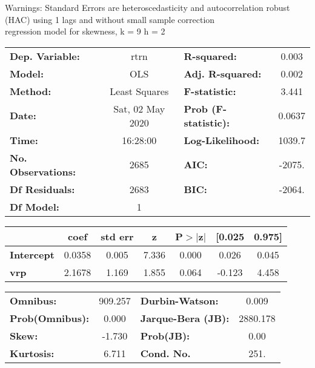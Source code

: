 Warnings: \newline
 [1] Standard Errors are heteroscedasticity and autocorrelation robust (HAC) using 1 lags and without small sample correction\\ 

regression model for skewness, k = 9 h = 2\begin{center}
\begin{tabular}{lclc}
\toprule
\textbf{Dep. Variable:}    &       rtrn       & \textbf{  R-squared:         } &     0.003   \\
\textbf{Model:}            &       OLS        & \textbf{  Adj. R-squared:    } &     0.002   \\
\textbf{Method:}           &  Least Squares   & \textbf{  F-statistic:       } &     3.441   \\
\textbf{Date:}             & Sat, 02 May 2020 & \textbf{  Prob (F-statistic):} &   0.0637    \\
\textbf{Time:}             &     16:28:00     & \textbf{  Log-Likelihood:    } &    1039.7   \\
\textbf{No. Observations:} &        2685      & \textbf{  AIC:               } &    -2075.   \\
\textbf{Df Residuals:}     &        2683      & \textbf{  BIC:               } &    -2064.   \\
\textbf{Df Model:}         &           1      & \textbf{                     } &             \\
\bottomrule
\end{tabular}
\begin{tabular}{lcccccc}
                   & \textbf{coef} & \textbf{std err} & \textbf{z} & \textbf{P$> |$z$|$} & \textbf{[0.025} & \textbf{0.975]}  \\
\midrule
\textbf{Intercept} &       0.0358  &        0.005     &     7.336  &         0.000        &        0.026    &        0.045     \\
\textbf{vrp}       &       2.1678  &        1.169     &     1.855  &         0.064        &       -0.123    &        4.458     \\
\bottomrule
\end{tabular}
\begin{tabular}{lclc}
\textbf{Omnibus:}       & 909.257 & \textbf{  Durbin-Watson:     } &    0.009  \\
\textbf{Prob(Omnibus):} &   0.000 & \textbf{  Jarque-Bera (JB):  } & 2880.178  \\
\textbf{Skew:}          &  -1.730 & \textbf{  Prob(JB):          } &     0.00  \\
\textbf{Kurtosis:}      &   6.711 & \textbf{  Cond. No.          } &     251.  \\
\bottomrule
\end{tabular}
\end{center}

